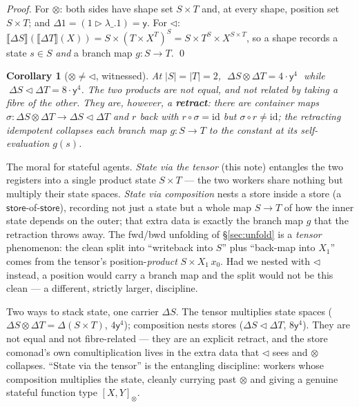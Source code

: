 \documentclass[11pt]{article}
\newcommand{\ctr}{\mathbin{\triangleright}}      %
\newcommand{\ext}[1]{\llbracket #1 \rrbracket}    %
\newcommand{\comp}{\mathbin{\triangleleft}}       %
\newcommand{\y}{\mathsf{y}}
\theoremstyle{plain}
\newtheorem{corollary}{Corollary}
\theoremstyle{definition}
\begin{document}
\begin{proof}
For $\otimes$: both sides have shape set $S\times T$ and, at every shape, position set
$S\times T$; and $\Delta 1=(1\ctr\lambda\_.1)=\y$. For $\comp$: $\ext{\Delta S}(\ext{\Delta T}(X)) =
S\times(T\times X^T)^S = S\times T^S\times X^{S\times T}$, so a shape records a state $s\in S$
\emph{and} a branch map $g:S\to T$. \qed
\end{proof}

\begin{corollary}[$\otimes\neq\comp$, witnessed]\label{cor:witness}
At $|S|=|T|=2$, $\;\Delta S\otimes\Delta T = 4\cdot\y^{4}\;$ while $\;\Delta S\comp\Delta T =
8\cdot\y^{4}$. The two products are not equal, and not related by taking a fibre of the other. They
are, however, a \textbf{retract}: there are container maps $\sigma:\Delta S\otimes\Delta T \to
\Delta S\comp\Delta T$ and $r$ back with $r\circ\sigma=\mathrm{id}$ but $\sigma\circ r\neq
\mathrm{id}$; the retracting idempotent collapses each branch map $g:S\to T$ to the constant at its
self-evaluation $g(s)$.
\end{corollary}

\noindent The moral for stateful agents. \emph{State via the tensor} (this note) entangles the two
registers into a single product state $S\times T$ --- the two workers share nothing but multiply
their state spaces. \emph{State via composition} nests a store inside a store (a
$\mathsf{store}$-of-$\mathsf{store}$), recording not just a state but a whole map $S\to T$ of how the
inner state depends on the outer; that extra data is exactly the branch map $g$ that the retraction
throws away. The fwd/bwd unfolding of \S\ref{sec:unfold} is a \emph{tensor} phenomenon: the clean
split into ``writeback into $S$'' plus ``back-map into $X_1$'' comes from the tensor's
position-\emph{product} $S\times X_1\,x_0$. Had we nested with $\comp$ instead, a position would
carry a branch map and the split would not be this clean --- a different, strictly larger, discipline.

\begin{deepbox}
Two ways to stack state, one carrier $\Delta S$. The tensor multiplies state spaces
($\Delta S\otimes\Delta T=\Delta(S\times T)$, $4\y^4$); composition nests stores
($\Delta S\comp\Delta T$, $8\y^4$). They are not equal and not fibre-related --- they are an
explicit retract, and the store comonad's own comultiplication lives in the extra data that
$\comp$ sees and $\otimes$ collapses. ``State via the tensor'' is the entangling discipline: workers
whose composition multiplies the state, cleanly currying past $\otimes$ and giving a genuine
stateful function type $[X,Y]_{\otimes}$.
\end{deepbox}
\end{document}
